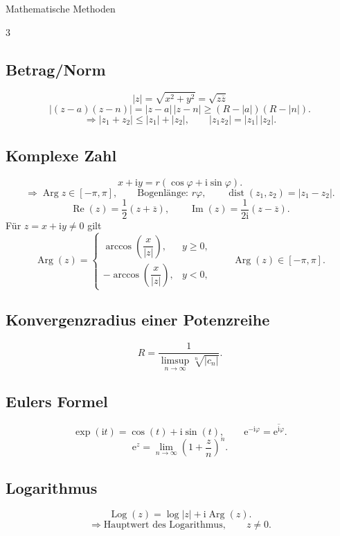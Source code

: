 \documentclass[a4paper,landscape]{article}
\newcommand{\ee}{\mathrm e}
\newcommand{\ii}{\mathrm i}
\DeclareMathOperator{\Arg}{Arg}
\DeclareMathOperator{\Log}{Log}
\DeclareMathOperator{\dist}{dist}
\begin{document}
\fontsize{7.6pt}{8.2pt}\selectfont
\setlength{\abovedisplayskip}{1.2pt}
\setlength{\belowdisplayskip}{1.2pt}
\setlength{\abovedisplayshortskip}{0.5pt}
\setlength{\belowdisplayshortskip}{0.5pt}
\setlength{\jot}{1pt}
\setlength{\columnsep}{4.5mm}
{\centering\large Mathematische Methoden\par\vspace{1mm}}

\begin{multicols*}{3}

\subsection*{Betrag/Norm}
\[
|z|=\sqrt{x^2+y^2}=\sqrt{z\overline z}
\]
\[
\left|(z-a)(z-n)\right|=|z-a|\,|z-n|
\ge (R-|a|)(R-|n|).
\]
\[
\Rightarrow |z_1+z_2|\le |z_1|+|z_2|,\qquad |z_1z_2|=|z_1|\,|z_2|.
\]

\subsection*{Komplexe Zahl}
\[
x+\ii y=r(\cos\varphi+\ii\sin\varphi).
\]
\[
\Rightarrow \Arg z\in[-\pi,\pi],\qquad \text{Bogenlänge: }r\varphi,\qquad \dist(z_1,z_2)=|z_1-z_2|.
\]
\[
\operatorname{Re}(z)=\frac12(z+\overline z),\qquad
\operatorname{Im}(z)=\frac{1}{2\ii}(z-\overline z).
\]
Für $z=x+\ii y\ne0$ gilt
\[
\Arg(z)=
\begin{cases}
\arccos\left(\dfrac{x}{|z|}\right),& y\ge0,\\[2mm]
-\arccos\left(\dfrac{x}{|z|}\right),& y<0,
\end{cases}
\qquad \Arg(z)\in[-\pi,\pi].
\]

\subsection*{Konvergenzradius einer Potenzreihe}
\[
R=\frac{1}{\limsup\limits_{n\to\infty}\sqrt[n]{|c_n|}}.
\]

\subsection*{Eulers Formel}
\[
\exp(\ii t)=\cos(t)+\ii\sin(t),\qquad \ee^{-\ii\varphi}=\overline{\ee^{\ii\varphi}}.
\]
\[
\ee^z=\lim_{n\to\infty}\left(1+\frac zn\right)^n.
\]

\subsection*{Logarithmus}
\[
\Log(z)=\log|z|+\ii\Arg(z).
\]
\[
\Rightarrow \text{Hauptwert des Logarithmus},\qquad z\ne0.
\]


\end{multicols*}
\end{document}
